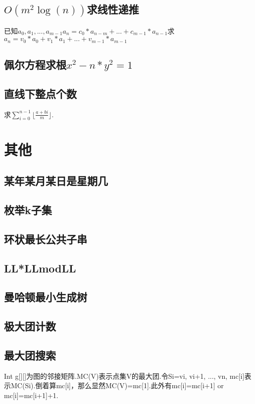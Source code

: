 \documentclass[landscape,a4paper]{article}
\begin{document}
\begin{spacing}{0.3}
\begin{multicols}{2}
	\subsection{$O(m^2 \log(n))$求线性递推}
	已知$a_0, a_1, ..., a_{m - 1}$$a_n = c_0 * a_{n - m} + ... + c_{m - 1} * a_{n - 1}$求$a_n = v_0 * a_0 + v_1 * a_1 + ... + v_{m - 1} * a_{m - 1}$
	
	\subsection{佩尔方程求根$x^2-n*y^2=1$}
	
	\subsection{直线下整点个数}
	求$\displaystyle\sum_{i=0}^{n-1} \lfloor\frac{a+bi}{m}\rfloor$.
	
	
	
	
	
	\section{其他}
	\subsection{某年某月某日是星期几}
	
	\subsection{枚举k子集}
	
	\subsection{环状最长公共子串}
	
	\subsection{LL*LLmodLL}
	
	\subsection{曼哈顿最小生成树}
	
	\subsection{极大团计数}
	
	\subsection{最大团搜索}
	Int g[][]为图的邻接矩阵.MC(V)表示点集V的最大团.令Si={vi, vi+1, ..., vn}, mc[i]表示MC(Si).倒着算mc[i]，那么显然MC(V)=mc[1].此外有mc[i]=mc[i+1] or mc[i]=mc[i+1]+1.
	

\end{multicols}
\end{spacing}
\end{document}
